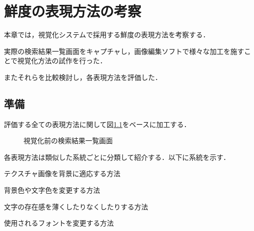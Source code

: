 \chapter{鮮度の表現方法の考察}
\label{chap:verification}

本章では，視覚化システムで採用する鮮度の表現方法を考察する．

実際の検索結果一覧画面をキャプチャし，画像編集ソフトで様々な加工を施すことで視覚化方法の試作を行った．

またそれらを比較検討し，各表現方法を評価した．

\newpage

\section{準備}

評価する全ての表現方法に関して図\ref{fig:ver-base}をベースに加工する．

\begin{figure}[htbp]
  \begin{center}
  \end{center}
  \caption{視覚化前の検索結果一覧画面}
  \label{fig:ver-base}
\end{figure}

各表現方法は類似した系統ごとに分類して紹介する．以下に系統を示す．

\begin{description}[style=sameline]
  \item[テクスチャによる表現方法] テクスチャ画像を背景に適応する方法
  \item[色による変化] 背景色や文字色を変更する方法
  \item[文字の消失による変化] 文字の存在感を薄くしたりなくしたりする方法
  \item[フォントによる変化] 使用されるフォントを変更する方法
\end{description}

